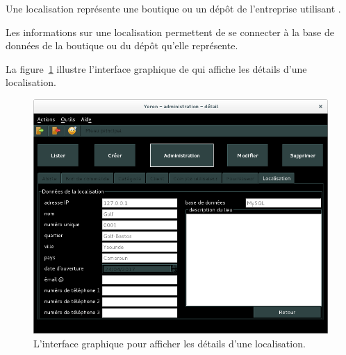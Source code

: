 
Une localisation repr\'esente une boutique ou un d\'ep\^ot
de l'entreprise utilisant \yeren.

Les informations sur une localisation permettent de
se connecter \`a la base de donn\'ees de la boutique
ou du d\'ep\^ot qu'elle repr\'esente.


La figure~\ref{fig:admin-localisations-afficher-details} illustre
l'interface graphique de \yeren qui affiche les d\'etails
d'une localisation.\\

\begin{figure}[!htpb]
	\centering
	\includegraphics[scale=0.45]{images/localisation-afficher-details.png}
	\caption{L'interface graphique pour afficher les d\'etails
			d'une localisation.}
	\label{fig:admin-localisations-afficher-details}
\end{figure}

